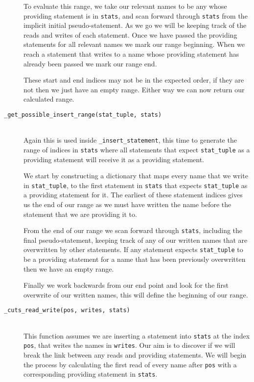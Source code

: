 \documentclass{report}
\begin{document}
\begin{description}
To evaluate this range, we take our relevant names to be any whose providing statement is in \texttt{stats}, and scan forward through \texttt{stats}
from the implicit initial pseudo-statement. As we go we will be keeping track of the reads and writes of each statement. Once we have passed the
providing statements for all relevant names we mark our range beginning. When we reach a statement that writes to a name whose providing statement
has already been passed we mark our range end.

These start and end indices may not be in the expected order, if they are not then we just have an empty range. Either way we can now return our calculated
range.

\item[\texttt{\_get\_possible\_insert\_range(stat\_tuple, stats)}] \hfill \\
Again this is used inside \texttt{\_insert\_statement}, this time to generate the range of indices in \texttt{stats} where all statements that expect
\texttt{stat\_tuple} as a providing statement will receive it as a providing statement. 

We start by constructing a dictionary that maps every name that we write in \texttt{stat\_tuple}, to the first statement in \texttt{stats} that expects
\texttt{stat\_tuple} as a providing statement for it. The earliest of these statement indices gives us the end of our range as we must have written the
name before the statement that we are providing it to.

From the end of our range we scan forward through \texttt{stats}, including the final pseudo-statement, keeping track of any of our written names that
are overwritten by other statements. If any statement expects \texttt{stat\_tuple} to be a providing statement for a name that has been previously
overwritten then we have an empty range.

Finally we work backwards from our end point and look for the first overwrite of our written names, this will define the beginning of our range.

\item[\texttt{\_cuts\_read\_write(pos, writes, stats)}] \hfill \\
This function assumes we are inserting a statement into \texttt{stats} at the index \texttt{pos}, that writes the names in \texttt{writes}. Our aim is
to discover if we will break the link between any reads and providing statements. We will begin the process by calculating the first read of every name
after \texttt{pos} with a corresponding providing statement in \texttt{stats}.


\end{description}
\end{document}
